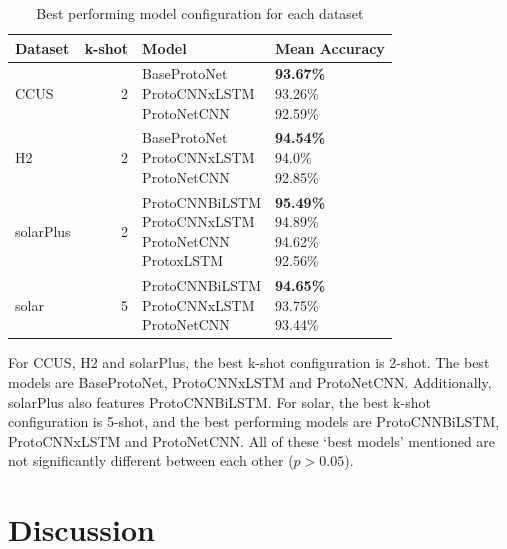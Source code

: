 \documentclass[manuscript, anonymous=true, review=true]{acmart}
\begin{document}
\begin{table}
  \centering
    \begin{tabular}{lrll}
        \hline
        Dataset & k-shot & Model & Mean Accuracy \\
        \hline
        CCUS & 2 & \thead{BaseProtoNet \\ ProtoCNNxLSTM \\ ProtoNetCNN} & \thead{\textbf{93.67\%} \\ 93.26\% \\ 92.59\%} \\
        H2 & 2 & \thead{BaseProtoNet \\ ProtoCNNxLSTM \\ ProtoNetCNN} & \thead{\textbf{94.54\%} \\ 94.0\% \\ 92.85\%} \\
        solarPlus & 2 & \thead{ProtoCNNBiLSTM \\ ProtoCNNxLSTM \\ ProtoNetCNN \\ ProtoxLSTM} & \thead{\textbf{95.49\%} \\ 94.89\% \\ 94.62\% \\ 92.56\%} \\
        solar & 5 & \thead{ProtoCNNBiLSTM \\ ProtoCNNxLSTM \\ ProtoNetCNN} & \thead{\textbf{94.65\%} \\ 93.75\% \\ 93.44\%} \\
        \hline
      \end{tabular}
  \caption{Best performing model configuration for each dataset}
  \label{table:bestModels}
\end{table}

For CCUS, H2 and solarPlus, the best k-shot configuration 
is 2-shot. The best models are BaseProtoNet, ProtoCNNxLSTM and ProtoNetCNN. Additionally, solarPlus also features ProtoCNNBiLSTM.
For solar, the best k-shot configuration is 5-shot, and the best performing models are ProtoCNNBiLSTM, ProtoCNNxLSTM and ProtoNetCNN.
All of these `best models' mentioned are not significantly different between each other (\( p>0.05\)).

\section{Discussion}
\end{document}
